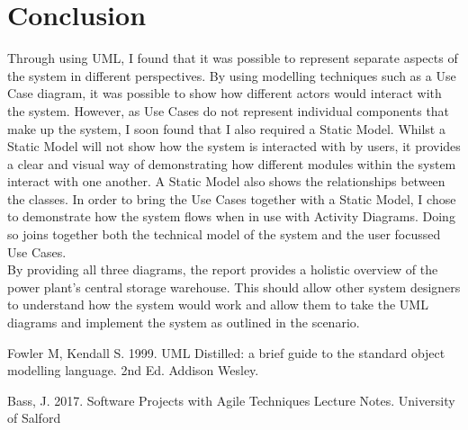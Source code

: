 \documentclass[a4paper,12pt]{article}
\begin{document}
\section{Conclusion}
Through using UML, I found that it was possible to represent separate aspects of the system in different perspectives. By using modelling techniques such as a Use Case diagram, it was possible to show how different actors would interact with the system. However, as Use Cases do not represent individual components that make up the system, I soon found that I also required a Static Model. Whilst a Static Model will not show how the system is interacted with by users, it provides a clear and visual way of demonstrating how different modules within the system interact with one another. A Static Model also shows the relationships between the classes. In order to bring the Use Cases together with a Static Model, I chose to demonstrate how the system flows when in use with Activity Diagrams. Doing so joins together both the technical model of the system and the user focussed Use Cases. 
\\
By providing all three diagrams, the report provides a holistic overview of the power plant's central storage warehouse. This should allow other system designers to understand how the system would work and allow them to take the UML diagrams and implement the system as outlined in the scenario. 
\newpage

\begin{thebibliography}{9}
	Fowler M, Kendall S. 1999. UML Distilled: a brief guide to the standard object modelling language. 2nd Ed. Addison Wesley. 

	Bass, J. 2017. Software Projects with Agile Techniques Lecture Notes. University of Salford
\end{thebibliography}
\end{document}
